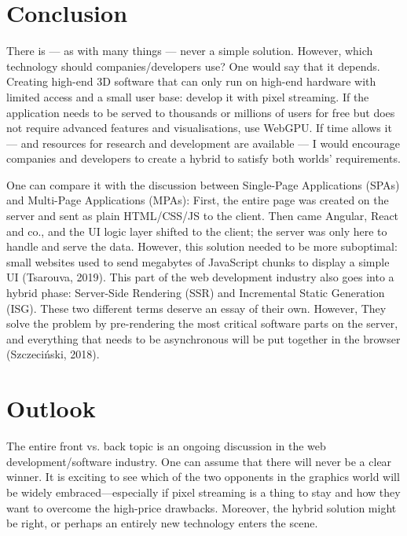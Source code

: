 \documentclass[10pt]{article}
\begin{document}
\begin{sloppypar}
  \section{Conclusion}
  \label{sec:conclusion}

  There is — as with many things — never a simple solution. However, which technology should companies/developers use? One would say that it depends. Creating high-end 3D software that can only run on high-end hardware with limited access and a small user base: develop it with pixel streaming. If the application needs to be served to thousands or millions of users for free but does not require advanced features and visualisations, use WebGPU. If time allows it — and resources for research and development are available — I would encourage companies and developers to create a hybrid to satisfy both worlds’ requirements.

  One can compare it with the discussion between Single-Page Applications (SPAs) and Multi-Page Applications (MPAs): First, the entire page was created on the server and sent as plain HTML/CSS/JS to the client. Then came Angular, React and co., and the UI logic layer shifted to the client; the server was only here to handle and serve the data. However, this solution needed to be more suboptimal: small websites used to send megabytes of JavaScript chunks to display a simple UI (Tsarouva, 2019). This part of the web development industry also goes into a hybrid phase: Server-Side Rendering (SSR) and Incremental Static Generation (ISG). These two different terms deserve an essay of their own. However, They solve the problem by pre-rendering the most critical software parts on the server, and everything that needs to be asynchronous will be put together in the browser (Szczeciński, 2018).

  \section{Outlook}
  \label{sec:outlook}

  The entire front vs. back topic is an ongoing discussion in the web development/software industry. One can assume that there will never be a clear winner. It is exciting to see which of the two opponents in the graphics world will be widely embraced—especially if pixel streaming is a thing to stay and how they want to overcome the high-price drawbacks. Moreover, the hybrid solution might be right, or perhaps an entirely new technology enters the scene.


  \pagebreak
  
  

\end{sloppypar}
\end{document}
